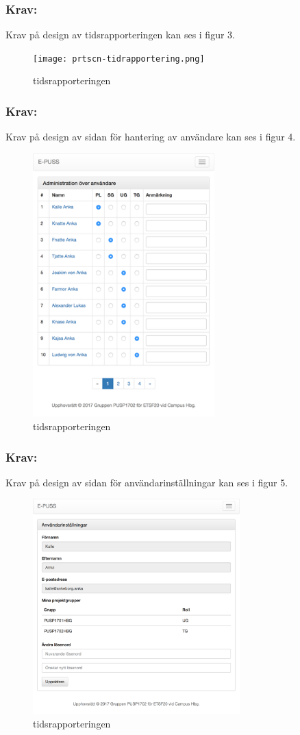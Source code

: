 \documentclass[paper=a4, fontsize=11pt,twoside]{article}
\begin{document}
\newpage
\subsubsection{Krav:} Krav på design av tidsrapporteringen kan ses i figur 3.
\begin{figure}[H]
\centering
\texttt{[image: prtscn-tidrapportering.png]}
\caption{tidsrapporteringen}
\end{figure}

\subsubsection{Krav:} Krav på design av sidan för hantering av användare kan ses i figur 4.
\begin{figure}[H]
\centering
\includegraphics[width=7cm]{anvandarhantering.png}
\caption{tidsrapporteringen}
\end{figure}

\subsubsection{Krav:} Krav på design av sidan för användarinställningar kan ses i figur 5.
\begin{figure}[H]
\centering
\includegraphics[width=8cm]{user_settings_page.png}
\caption{tidsrapporteringen}
\end{figure}
\end{document}
